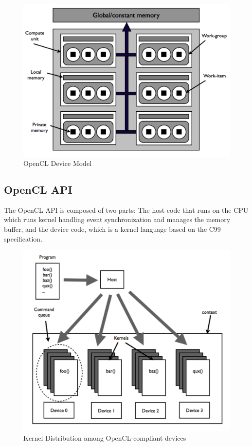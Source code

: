 \begin{figure}[H]
\caption{OpenCL Device Model}
\centering
\includegraphics[scale=0.5]{OpenCL_Device_Model.pdf}
\end{figure}

\subsection{OpenCL API}

The \gls{OpenCL} \gls{API} is composed of two parts: The host code that runs on the CPU which runs kernel handling event synchronization and manages the memory buffer, and the device code, which is a kernel language based on the C99 specification.

\begin{figure}[H]
\caption{Kernel Distribution among OpenCL-compliant devices}
\centering
\includegraphics[scale=0.5]{OpenCL_Objects.pdf}
\end{figure}

